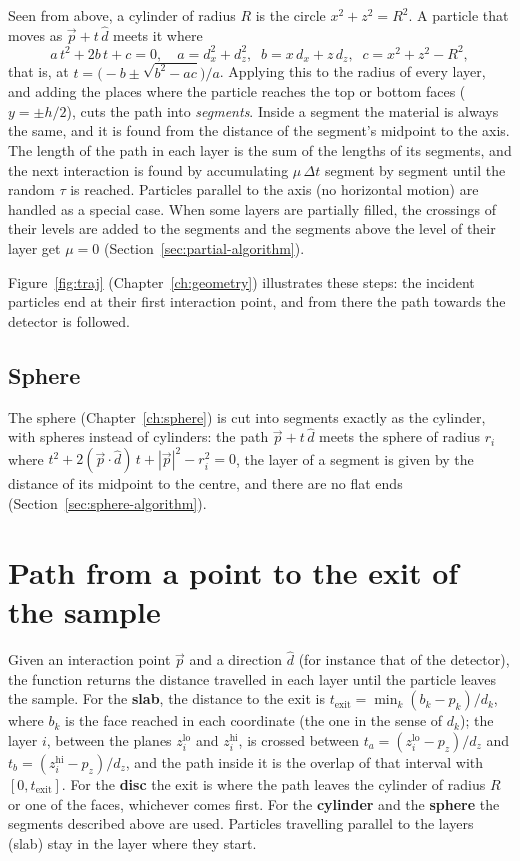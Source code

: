 Seen from above, a cylinder of radius $R$ is the circle $x^2+z^2=R^2$. A particle that moves as $\vec p+t\,\hat d$ meets it
where
\begin{equation}
  a\,t^2+2b\,t+c=0,\quad a=d_x^2+d_z^2,\;\; b=x\,d_x+z\,d_z,\;\; c=x^2+z^2-R^2,
\end{equation}
that is, at $t=\big(-b\pm\sqrt{b^2-ac}\big)/a$. Applying this to the radius of every layer, and adding the places where the particle
reaches the top or bottom faces ($y=\pm h/2$), cuts the path into \emph{segments}. Inside a segment the material is always the
same, and it is found from the distance of the segment's midpoint to the axis. The length of the path in each layer is the sum of the
lengths of its segments, and the next interaction is found by accumulating $\mu\,\Delta t$ segment by segment until the random
$\tau$ is reached. Particles parallel to the axis (no horizontal motion) are handled as a special case. When some layers are
partially filled, the crossings of their levels are added to the segments and the segments above the level of their layer get
$\mu=0$ (Section~\ref{sec:partial-algorithm}).

Figure~\ref{fig:traj} (Chapter~\ref{ch:geometry}) illustrates these steps: the incident particles end at their first interaction point, and from there the path towards the detector is followed.

\subsection{Sphere}

The sphere (Chapter~\ref{ch:sphere}) is cut into segments exactly as the cylinder, with spheres instead of cylinders: the path
$\vec p+t\,\hat d$ meets the sphere of radius $r_i$ where $t^2 + 2(\vec p\cdot\hat d)\,t + |\vec p|^2 - r_i^2 = 0$, the layer of a
segment is given by the distance of its midpoint to the centre, and there are no flat ends (Section~\ref{sec:sphere-algorithm}).

\section{Path from a point to the exit of the sample}

Given an interaction point $\vec p$ and a direction $\hat d$ (for instance that of the detector), the function
 returns the distance travelled in each layer until the particle leaves the sample.
For the \textbf{slab}, the distance to the exit is $t_\mathrm{exit}=\min_k (b_k-p_k)/d_k$, where $b_k$ is the face reached in each coordinate
(the one in the sense of $d_k$); the layer $i$, between the planes $z_i^\mathrm{lo}$ and $z_i^\mathrm{hi}$, is crossed between
$t_a=(z_i^\mathrm{lo}-p_z)/d_z$ and $t_b=(z_i^\mathrm{hi}-p_z)/d_z$, and the path inside it is the overlap of that interval with
$[0,t_\mathrm{exit}]$. For the \textbf{disc} the exit is where the path leaves the cylinder of radius $R$ or one of the faces,
whichever comes first. For the \textbf{cylinder} and the \textbf{sphere} the segments described above are used. Particles travelling parallel to the layers (slab) stay in the layer where they start.

